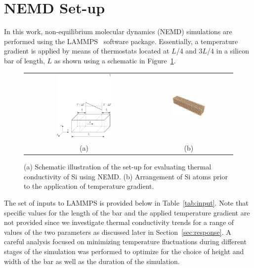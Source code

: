\section{NEMD Set-up}
\label{sec:setup}

In this work, non-equilibrium molecular dynamics (NEMD) simulations are performed using the 
LAMMPS~\cite{Plimpton:2007} software package.
Essentially, a temperature gradient is applied by means of  thermostats located
at $L$/4 and $3L$/4 in a silicon bar of length, $L$ 
as shown using a schematic in Figure~\ref{fig:setup}. 

\begin{figure}[htbp]
\begin{center}
\begin{tabular}{cc}
  \includegraphics[width=0.48\textwidth]{./Figures/schematic}
  &
  \hspace{3mm}
  \includegraphics[width=0.40\textwidth]{./Figures/Sibar_05}
  \\ (a) & (b)
  \end{tabular}
\caption{(a) Schematic illustration of the set-up for evaluating thermal conductivity of Si using NEMD. (b) 
Arrangement of Si atoms prior to the application of temperature gradient.}
\label{fig:setup}
\end{center}
\end{figure}

The set of
inputs to LAMMPS is provided below in Table~\ref{tab:input}. Note that specific values for the length of the bar
and the applied temperature gradient are not provided since we investigate thermal conductivity trends for a range of 
values of the two parameters as discussed later in Section~\ref{sec:response}. A careful analysis focused on
minimizing temperature fluctuations during different stages of the simulation was performed to optimize for the
choice of height and width of the bar as well as the duration of the simulation. 

